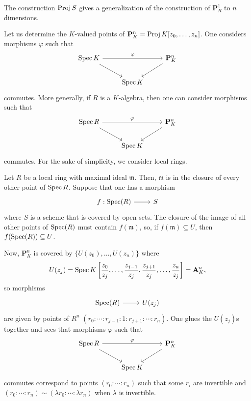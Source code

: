 \documentclass [11 pt, oneside] {article}
\begin{document}
\begin{remark}
	The construction $\operatorname{Proj} S$ gives a generalization of the construction of $\mathbf{P}^1_{R}$ to $n$ dimensions.
\end{remark}

\begin{example}[ ]\label{}\text{}
Let us determine the $K$-valued points of $\mathbf{P}^n_K = \operatorname{Proj} K[ z_0,\hdots, z_n]$. One considers morphisms $\varphi$ such that
\[
\begin{tikzcd}
	\Spec K \ar[rr,"\varphi"] \ar[dr] &&\mathbf{P}^n_K \ar[dl] \\
					  &\Spec K
\end{tikzcd}
\]
commutes. More generally, if $R$ is a $K$-algebra, then one can consider morphisms such that
\[
\begin{tikzcd}
\Spec R\ar[rr,"\varphi"] \ar[dr] &&\mathbf{P}^n_K \ar[dl] \\
                                          &\Spec K	
\end{tikzcd}
\]
commutes. For the sake of simplicity, we consider local rings.

Let $R$ be a local ring with maximal ideal $\mathfrak{m}$. Then, $\mathfrak{m}$ is in the closure of every other point of $\operatorname{Spec} R$. Suppose that one has a morphism 
\[
\begin{tikzcd}
f:\Spec (R)\ar[r]& S
\end{tikzcd}
\] 
where $S$ is a scheme that is covered by open sets. The closure of the image of all other points of $\operatorname{Spec} (R)$ must contain $f(\mathfrak{m})$, so, if $f(\mathfrak{m}) \subseteq U$, then $f(\operatorname{Spec} (R))\subseteq U$.

Now, $\mathbf{P}^n_K$ is covered by $\{U({z_0}), \hdots, U(z_n)\}$ where 
\begin{align*}
	U(z_j)= \operatorname{Spec} K \left[ \frac{z_0}{z_j},\hdots, \frac{z_{j-1}}{z_j}, \frac{z_{j+1}}{z_j},\hdots, \frac{z_n}{z_j} \right] = \mathbf{A}^n_K, 
\end{align*}
so morphisms
\[
\begin{tikzcd}
\Spec (R)\ar[r]& U(z_j)
\end{tikzcd}
\] 
are given by points of $R^n$ $(r_0:\cdots:r_{j-1}:1:r_{j+1}:\cdots:r_n)$. One glues the $U(z_j)$s together and sees that morphisms $\varphi$ such that 
\[
\begin{tikzcd}
	\Spec R\ar[dr]\ar[rr,"\varphi"] &&\mathbf{P}^n_K\ar[dl]\\
				       &\Spec K
\end{tikzcd}
\]
commutes correspond to points $(r_0:\cdots:r_n)$ such that some $r_i$ are invertible and $(r_0:\cdots:r_n) \sim (\lambda r_0:\cdots:\lambda r_n)$ when $\lambda$ is invertible.
\end{example}
\end{document}
